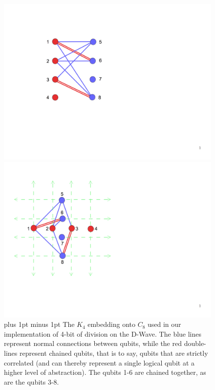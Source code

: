 \documentclass[preprint,12pt,eqsecnum,nofootinbib,amsmath,amssymb]{revtex4}
\newcommand{\footnoteskip}{\baselineskip 12pt plus 1pt minus 1pt}
\begin{document}
\begin{figure}[h!]
\begin{minipage}[c]{0.4\linewidth}
\includegraphics[scale=0.40]{figs/K4_embedding_0.png}
\end{minipage}
\hfill
\begin{minipage}[c]{0.4\linewidth}
\includegraphics[scale=0.35]{figs/K4_embedding_1.png}
\end{minipage}
\vskip-2.0cm
\caption{\footnoteskip
The $K_4$ embedding onto $C_8$ used in our implementation 
of 4-bit of division on the D-Wave. The blue lines represent normal connections 
between qubits, while the red double-lines represent chained qubits, that is 
to say, qubits that are strictly correlated (and can thereby represent a  single 
logical qubit at a higher level of abstraction). The qubits 1-6 are chained
together, as are the qubits 3-8.
}
\label{fig_K4_embedding_1}
\end{figure}
\end{document}

